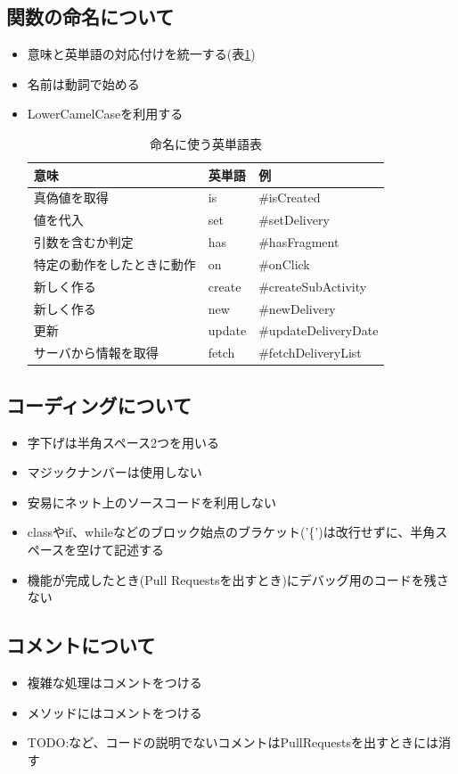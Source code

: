 \documentclass[a4j,titlepage]{jarticle}
\begin{document}
\subsection{関数の命名について}
\begin{itemize}
\item 意味と英単語の対応付けを統一する(表\ref{namingTable})
\item 名前は動詞で始める
\item LowerCamelCaseを利用する
\begin{table}[htb]
\centering
\caption{命名に使う英単語表}
\label{namingTable}
\begin{tabular}{|lll|}
\hline
意味            & 英単語    & 例                    \\ \hline
真偽値を取得        & is     & \#isCreated          \\
値を代入          & set    & \#setDelivery        \\
引数を含むか判定      & has    & \#hasFragment        \\
特定の動作をしたときに動作 & on     & \#onClick            \\
新しく作る         & create & \#createSubActivity  \\
新しく作る         & new    & \#newDelivery        \\
更新            & update & \#updateDeliveryDate \\
サーバから情報を取得    & fetch  & \#fetchDeliveryList  \\ \hline
\end{tabular}
\end{table}
\end{itemize}

\subsection{コーディングについて}
\begin{itemize}
\item 字下げは半角スペース2つを用いる
\item マジックナンバーは使用しない
\item 安易にネット上のソースコードを利用しない
\item classやif、whileなどのブロック始点のブラケット('\{')は改行せずに、半角スペースを空けて記述する
\item 機能が完成したとき(Pull Requestsを出すとき)にデバッグ用のコードを残さない
\end{itemize}

\subsection{コメントについて}
\begin{itemize}
    \item 複雑な処理はコメントをつける
    \item メソッドにはコメントをつける
    \item TODO:など、コードの説明でないコメントはPullRequestsを出すときには消す
\end{itemize}
\end{document}
